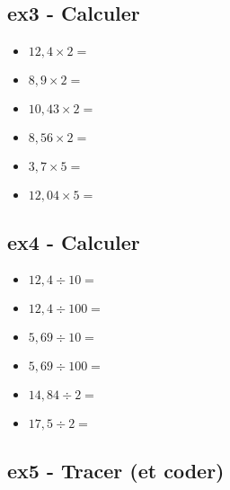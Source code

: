 \begin{multicols}{2} 

\subsection*{ex3 - Calculer}

\begin{itemize}[label={$\bullet$}]
  \item $12,4 \times 2 = $ \dotfill \\
  \item $8,9 \times 2 = $ \dotfill \\
  \item $10,43 \times 2 = $ \dotfill \\
  \item $8,56 \times 2 = $ \dotfill \\
  \item $3,7 \times 5 = $ \dotfill \\
  \item $12,04 \times 5 = $ \dotfill \\
\end{itemize} 

\subsection*{ex4 - Calculer}

\begin{itemize}[label={$\bullet$}]
  \item $12,4 \div 10 = $ \dotfill \\
  \item $12,4 \div 100 = $ \dotfill \\
  \item $5,69 \div 10 = $ \dotfill \\
  \item $5,69 \div 100 = $ \dotfill \\
  \item $14,84 \div 2 = $ \dotfill \\
  \item $17,5 \div 2 = $ \dotfill \\
\end{itemize} 
\end{multicols}

\subsection*{ex5 - Tracer (et coder)}

